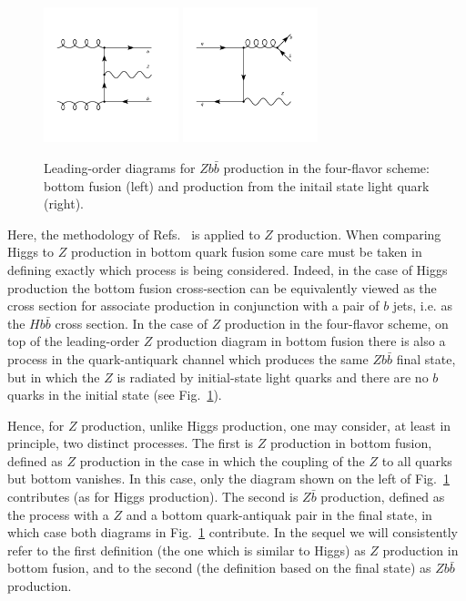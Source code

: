 \documentclass[12pt]{article}
\begin{document}
\begin{figure}
  \begin{center}
    \includegraphics[width=0.35\textwidth]{ggZbb_t.pdf}
    \includegraphics[width=0.35\textwidth]{qq_gbb.pdf} 
    \caption{\label{fig:fusvsfs} Leading-order diagrams for $Zb\bar b$ 
 production in the four-flavor scheme: bottom fusion (left)
 and production from the initail state light quark (right).
    }
  \end{center}
\end{figure}
Here, the methodology of
Refs.~\cite{Forte:2015hba,Forte:2016sja} is applied to $Z$
production. When comparing Higgs to $Z$ production in bottom quark
fusion some care must be taken in defining exactly which process is
being considered. 
Indeed, in the case of Higgs production the bottom fusion
cross-section can be equivalently viewed as the cross section for
associate production in conjunction with a pair of $b$ jets, i.e. as the
$H b\bar b$ cross section. In the case of $Z$ production in the
four-flavor scheme, on top of the leading-order $Z$ production diagram
in bottom fusion  there is also a process in the quark-antiquark
channel which produces the same $Z b\bar b$ final state, but in which
the $Z$ is radiated by  initial-state  light quarks and there are no
$b$ quarks in the initial state (see Fig.~\ref{fig:fusvsfs}).

Hence, for $Z$ production, unlike Higgs production, one may consider,
at least in principle, two distinct processes. The first is $Z$ production
in bottom fusion, defined as $Z$ production in the case in
which the coupling of the $Z$ to all quarks but bottom vanishes. In
this case, only the diagram shown on the left of
Fig.~\ref{fig:fusvsfs} contributes (as for Higgs production). The
second is $Z\bar b$ production, defined as the process with a $Z$ and a
bottom quark-antiquak pair in the final state, in which case both
diagrams in Fig.~\ref{fig:fusvsfs} contribute. In the sequel we will
consistently refer to the first definition (the one which is similar
to Higgs) as $Z$ production in bottom fusion, and to the second (the
definition based on the final state) as $Zb\bar b$ production.
\end{document}
